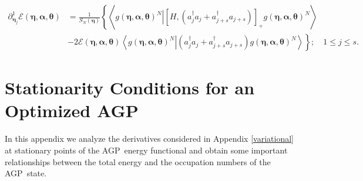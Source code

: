 \documentclass[aps,preprint]{revtex4}%
\begin{document}
\begin{align}
\partial_{\mathbf{\eta}_{j}}^{1}\mathcal{E}\left(  \mathbf{\eta}%
,\mathbf{\alpha},\mathbf{\theta}\right)   &  =\frac{1}{S_{N}\left(
\mathbf{\eta}\right)  }\left\{  \left\langle \left.  g\left(  \mathbf{\eta
},\mathbf{\alpha},\mathbf{\theta}\right)  ^{N}\right\vert \left[  H,\left(
a_{j}^{\dagger}a_{j}+a_{j+s}^{\dagger}a_{j+s}\right)  \right]  _{+}g\left(
\mathbf{\eta},\mathbf{\alpha},\mathbf{\theta}\right)  ^{N}\right\rangle
\right. \nonumber\\
&  -\left.  2\mathcal{E}\left(  \mathbf{\eta},\mathbf{\alpha},\mathbf{\theta
}\right)  \left\langle \left.  g\left(  \mathbf{\eta},\mathbf{\alpha
},\mathbf{\theta}\right)  ^{N}\right\vert \left(  a_{j}^{\dagger}a_{j}%
+a_{j+s}^{\dagger}a_{j+s}\right)  g\left(  \mathbf{\eta},\mathbf{\alpha
},\mathbf{\theta}\right)  ^{N}\right\rangle \right\}  ;\quad1\leq j\leq s.
\label{Deta}%
\end{align}


\section{Stationarity Conditions for an Optimized AGP\label{StatAGPCond}}

In this appendix we analyze the derivatives considered in Appendix
\ref{variational} at stationary points of the AGP\ energy functional and
obtain some important relationships between the total energy and the
occupation numbers of the AGP\ state.
\end{document}
